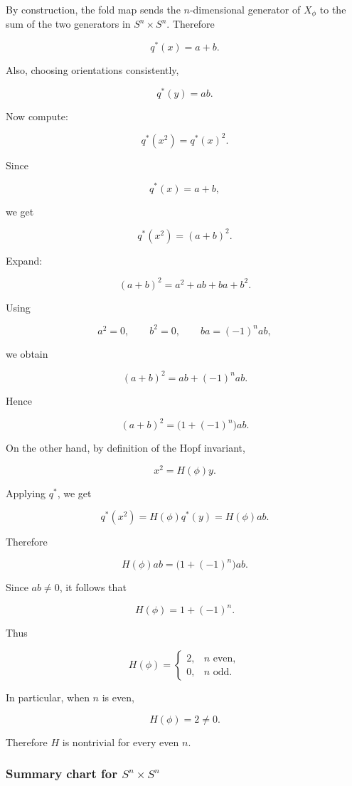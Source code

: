 \documentclass[12pt,a4paper]{article}
\theoremstyle{notespace}
\begin{document}
By construction, the fold map sends the \(n\)-dimensional generator of \(X_\phi\) to the sum of the two generators in \(S^n\times S^n\). Therefore

\[
q^*(x)=a+b.
\]

Also, choosing orientations consistently,

\[
q^*(y)=ab.
\]

Now compute:

\[
q^*(x^2)=q^*(x)^2.
\]

Since

\[
q^*(x)=a+b,
\]

we get

\[
q^*(x^2)=(a+b)^2.
\]

Expand:

\[
(a+b)^2=a^2+ab+ba+b^2.
\]

Using

\[
a^2=0,
\qquad
b^2=0,
\qquad
ba=(-1)^n ab,
\]

we obtain

\[
(a+b)^2
=
ab+(-1)^n ab.
\]

Hence

\[
(a+b)^2
=
\bigl(1+(-1)^n\bigr)ab.
\]

On the other hand, by definition of the Hopf invariant,

\[
x^2=H(\phi)y.
\]

Applying \(q^*\), we get

\[
q^*(x^2)
=
H(\phi)q^*(y)
=
H(\phi)ab.
\]

Therefore

\[
H(\phi)ab
=
\bigl(1+(-1)^n\bigr)ab.
\]

Since \(ab\neq 0\), it follows that

\[
\boxed{
	H(\phi)=1+(-1)^n.
}
\]

Thus

\[
H(\phi)=
\begin{cases}
	2, & n\text{ even},\\
	0, & n\text{ odd}.
\end{cases}
\]

In particular, when \(n\) is even,

\[
\boxed{
	H(\phi)=2\neq 0.
}
\]

Therefore \(H\) is nontrivial for every even \(n\).

\subsubsection*{Summary chart for \(S^n\times S^n\)}
\end{document}
